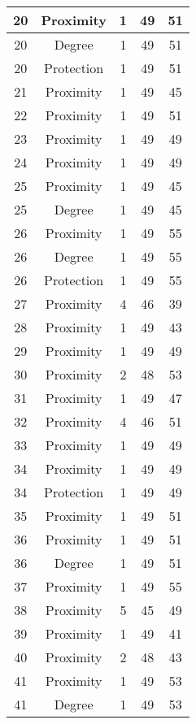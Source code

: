 \documentclass[results.tex]{subfiles}
\begin{document}
\begin{center}
\begin{tabular}{| c || c | c | c | c |}
    \hline
    20 & Proximity & 1 & 49 & 51 \\ 
    \hline
    20 & Degree & 1 & 49 & 51 \\ 
    \hline
    20 & Protection & 1 & 49 & 51 \\ 
    \hline
    21 & Proximity & 1 & 49 & 45 \\ 
    \hline
    22 & Proximity & 1 & 49 & 51 \\ 
    \hline
    23 & Proximity & 1 & 49 & 49 \\ 
    \hline
    24 & Proximity & 1 & 49 & 49 \\ 
    \hline
    25 & Proximity & 1 & 49 & 45 \\ 
    \hline
    25 & Degree & 1 & 49 & 45 \\ 
    \hline
    26 & Proximity & 1 & 49 & 55 \\ 
    \hline
    26 & Degree & 1 & 49 & 55 \\ 
    \hline
    26 & Protection & 1 & 49 & 55 \\ 
    \hline
    27 & Proximity & 4 & 46 & 39 \\ 
    \hline
    28 & Proximity & 1 & 49 & 43 \\ 
    \hline
    29 & Proximity & 1 & 49 & 49 \\ 
    \hline
    30 & Proximity & 2 & 48 & 53 \\ 
    \hline
    31 & Proximity & 1 & 49 & 47 \\ 
    \hline
    32 & Proximity & 4 & 46 & 51 \\ 
    \hline
    33 & Proximity & 1 & 49 & 49 \\ 
    \hline
    34 & Proximity & 1 & 49 & 49 \\ 
    \hline
    34 & Protection & 1 & 49 & 49 \\ 
    \hline
    35 & Proximity & 1 & 49 & 51 \\ 
    \hline
    36 & Proximity & 1 & 49 & 51 \\ 
    \hline
    36 & Degree & 1 & 49 & 51 \\ 
    \hline
    37 & Proximity & 1 & 49 & 55 \\ 
    \hline
    38 & Proximity & 5 & 45 & 49 \\ 
    \hline
    39 & Proximity & 1 & 49 & 41 \\ 
    \hline
    40 & Proximity & 2 & 48 & 43 \\ 
    \hline
    41 & Proximity & 1 & 49 & 53 \\ 
    \hline
    41 & Degree & 1 & 49 & 53 \\ 

\end{tabular}
\end{center}
\end{document}
